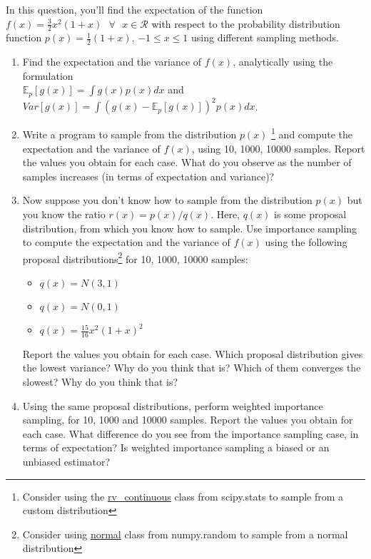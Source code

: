 \documentclass[12pt]{article}
\begin{document}
In this question, you'll find the expectation of the function $f(x) = \frac{3}{2}x^2(1 + x) \text{ } \forall\text{ } x \in \mathcal{R}$  with respect to the probability distribution function $p(x) = \frac{1}{2}(1 + x)$, $-1 \le x \le 1$ using different sampling methods. 

\begin{enumerate}
    \item Find the expectation and the variance of $f(x)$, analytically using the formulation \\ $\mathbb{E}_p[g(x)] = \int g(x)p(x)dx $ and $Var[g(x)] = \int (g(x) - \mathbb{E}_p[g(x)])^2p(x)dx $.
    \item Write a program to sample from the distribution $p(x)$ \footnote{Consider using the \href{https://docs.scipy.org/doc/scipy/reference/generated/scipy.stats.rv_continuous.html}{\underline{rv\_continuous}} class from scipy.stats to sample from a custom distribution} and compute the expectation and the variance of $f(x)$, using 10, 1000, 10000 samples. Report the values you obtain for each case. What do you observe as the number of samples increases (in terms of expectation and variance)?
    \item Now suppose you don't know how to sample from the distribution $p(x)$ but you know the ratio $r(x) = p(x)/q(x)$. Here, $q(x)$ is some proposal distribution, from which you know how to sample. Use importance sampling to compute the expectation and the variance of $f(x)$ using the following proposal distributions\footnote{Consider using \href{https://docs.scipy.org/doc/numpy-1.15.0/reference/generated/numpy.random.normal.html}{\underline{normal}} class from numpy.random to sample from a normal distribution} for 10, 1000, 10000 samples:
    \begin{itemize}
        \item $q(x) = N(3,1)$
        \item $q(x) = N(0,1)$
        \item $q(x) = \frac{15}{16}x^2(1+x)^2$
    \end{itemize}
    Report the values you obtain for each case. Which proposal distribution gives the lowest variance? Why do you think that is? Which of them converges the slowest? Why do you think that is?
    \item Using the same proposal distributions, perform weighted importance sampling, for 10, 1000 and 10000 samples. Report the values you obtain for each case. What difference do you see from the importance sampling case, in terms of expectation? Is weighted importance sampling a biased or an unbiased estimator?
\end{enumerate}
\end{document}
